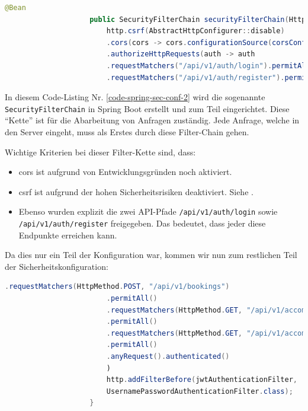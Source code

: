 				\begin{lstlisting}[caption={Erstellung der SecurityFilterChain in Spring Boot.}, label={code-spring-sec-conf-2}, language=Java]
					@Bean
					public SecurityFilterChain securityFilterChain(HttpSecurity http) {
						http.csrf(AbstractHttpConfigurer::disable)
						.cors(cors -> cors.configurationSource(corsConfigurationSource()))
						.authorizeHttpRequests(auth -> auth
						.requestMatchers("/api/v1/auth/login").permitAll()
						.requestMatchers("/api/v1/auth/register").permitAll()
					\end{lstlisting}
					
					In diesem Code-Listing Nr. \ref{code-spring-sec-conf-2} wird die sogenannte \texttt{SecurityFilterChain} in Spring Boot erstellt und zum Teil eingerichtet. Diese \enquote{Kette} ist für die Abarbeitung von Anfragen zuständig. Jede Anfrage, welche in den Server eingeht, muss als Erstes durch diese Filter-Chain gehen. 
					
					Wichtige Kriterien bei dieser Filter-Kette sind, dass:
					
					\begin{itemize}
						\item \gls{cors} ist aufgrund von Entwicklungsgründen noch aktiviert.
						\item \gls{csrf} ist aufgrund der hohen Sicherheitsrisiken deaktiviert. Siehe \cite{website-csrf-explanation}.
						\item Ebenso wurden explizit die zwei API-Pfade \texttt{/api/v1/auth/login} sowie \texttt{/api/v1/auth/register} freigegeben. Das bedeutet, dass jeder diese Endpunkte erreichen kann.
					\end{itemize}
					
					Da dies nur ein Teil der Konfiguration war, kommen wir nun zum restlichen Teil der Sicherheitskonfiguration:

                    \newpage
                    
					\begin{lstlisting}[caption={Fertigstellung der Definition der SecurityFilterChain in Spring Boot.}, label={code-spring-sec-conf-3},language=Java]
						.requestMatchers(HttpMethod.POST, "/api/v1/bookings")
						.permitAll()
						.requestMatchers(HttpMethod.GET, "/api/v1/accommodations")
						.permitAll()
						.requestMatchers(HttpMethod.GET, "/api/v1/accommodations/{id}")
						.permitAll()
						.anyRequest().authenticated()
						)
						http.addFilterBefore(jwtAuthenticationFilter, 
						UsernamePasswordAuthenticationFilter.class);
					}
				\end{lstlisting}
				
